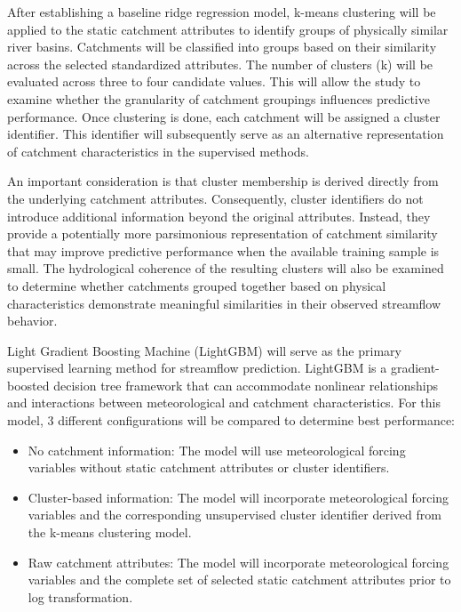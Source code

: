 After establishing a baseline ridge regression model, k-means clustering
will be applied to the static catchment attributes to identify groups of
physically similar river basins. Catchments will be classified into
groups based on their similarity across the selected standardized
attributes. The number of clusters (k) will be evaluated across three to
four candidate values. This will allow the study to examine whether the
granularity of catchment groupings influences predictive performance.
Once clustering is done, each catchment will be assigned a cluster
identifier. This identifier will subsequently serve as an alternative
representation of catchment characteristics in the supervised methods.

An important consideration is that cluster membership is derived
directly from the underlying catchment attributes. Consequently, cluster
identifiers do not introduce additional information beyond the original
attributes. Instead, they provide a potentially more parsimonious
representation of catchment similarity that may improve predictive
performance when the available training sample is small. The
hydrological coherence of the resulting clusters will also be examined
to determine whether catchments grouped together based on physical
characteristics demonstrate meaningful similarities in their observed
streamflow behavior.

Light Gradient Boosting Machine (LightGBM) will serve as the primary
supervised learning method for streamflow prediction. LightGBM is a
gradient-boosted decision tree framework that can accommodate nonlinear
relationships and interactions between meteorological and catchment
characteristics. For this model, 3 different configurations will be
compared to determine best performance:

\begin{itemize}
\tightlist
\item
  No catchment information: The model will use meteorological forcing
  variables without static catchment attributes or cluster identifiers.
\item
  Cluster-based information: The model will incorporate meteorological
  forcing variables and the corresponding unsupervised cluster
  identifier derived from the k-means clustering model.
\item
  Raw catchment attributes: The model will incorporate meteorological
  forcing variables and the complete set of selected static catchment
  attributes prior to log transformation.
\end{itemize}
